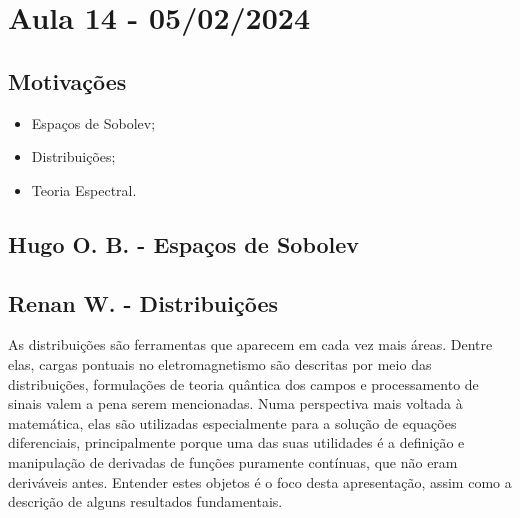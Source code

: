 \documentclass[MeasureTheory/measure_theory.tex]{subfiles}
\begin{document}
\section{Aula 14 - 05/02/2024}
\subsection{Motivações}
\begin{itemize}
	\item Espaços de Sobolev;
	\item Distribuições;
	\item Teoria Espectral.
\end{itemize}
\subsection{Hugo O. B. - Espaços de Sobolev}
\subsection{Renan W. - Distribuições}
As distribuições são ferramentas que aparecem em cada vez mais áreas. Dentre elas, cargas pontuais no eletromagnetismo são descritas por meio das distribuições,
formulações de teoria quântica dos campos e processamento de sinais valem a pena serem mencionadas. Numa perspectiva mais voltada à matemática, elas são utilizadas especialmente
para a solução de equações diferenciais, principalmente porque uma das suas utilidades é a definição e manipulação de derivadas de funções puramente contínuas, que não eram deriváveis antes.
Entender estes objetos é o foco desta apresentação, assim como a descrição de alguns resultados fundamentais.
\end{document}
